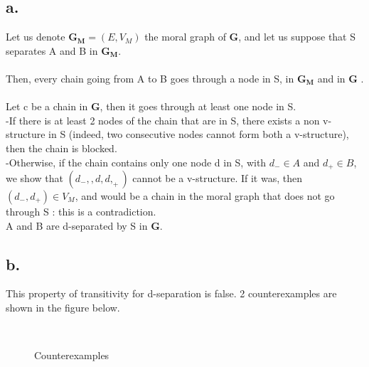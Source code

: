 \documentclass[12pt]{article}
\begin{document}
\subsection*{a.}
Let us denote $\mathbf{G_M}=(E, V_{M})$ the moral graph of $\mathbf{G}$, and let us suppose that S separates A and B in $\mathbf{G_M}$.~\\
~\\
Then, every chain going from A to B goes through a node in S, in $\mathbf{G_M}$ and in $\mathbf{G}$ . ~\\
Let c be a chain in $\mathbf{G}$, then it goes through at least one node in S.~\\
-If there is at least 2 nodes of the chain that are in S, there exists a non v-structure in S (indeed, two consecutive nodes cannot form both a v-structure), then the chain is blocked.~\\
-Otherwise, if the chain contains only one node d in S, with $d_{-} \in A$ and $d_{+} \in B$, we show that $(d_{-},,d,d,_{+})$ cannot be a v-structure. If it was, then $(d_{-}, d_{+}) \in V_{M}$, and would be a chain in the moral graph that does not go through S : this is a contradiction.~\\
A and B are d-separated by S in $\mathbf{G}$.


\subsection*{b.}
This property of transitivity for d-separation is false. 2 counterexamples are shown in the figure below.
\begin{figure} [h!]
\centering
   \hfill 
   \\
  \caption{Counterexamples}
  \label{fig:ex2_dags}
\end{figure}
\newpage
\end{document}
